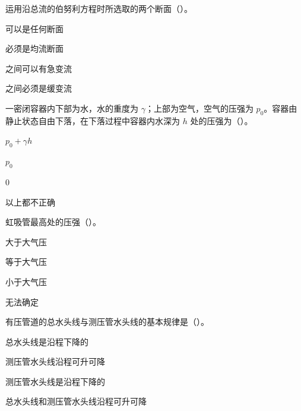 \begin{ti}
\item 运用沿总流的伯努利方程时所选取的两个断面（\quad）。
\begin{choices}
\item 可以是任何断面
\item 必须是均流断面
\item 之间可以有急变流
\item 之间必须是缓变流
\end{choices}

\item 一密闭容器内下部为水，水的重度为 $\gamma$；上部为空气，空气的压强为 $p_0$。容器由静止状态自由下落，在下落过程中容器内水深为 $h$ 处的压强为（\quad）。
\begin{choices}
\item $p_0+\gamma h$
\item $p_0$
\item $0$
\item 以上都不正确
\end{choices}

\item 虹吸管最高处的压强（\quad）。
\begin{choices}
\item 大于大气压
\item 等于大气压
\item 小于大气压
\item 无法确定
\end{choices}

\item 有压管道的总水头线与测压管水头线的基本规律是（\quad）。
\begin{choices}
\item 总水头线是沿程下降的
\item 测压管水头线沿程可升可降
\item 测压管水头线是沿程下降的
\item 总水头线和测压管水头线沿程可升可降
\end{choices}


\end{ti}
